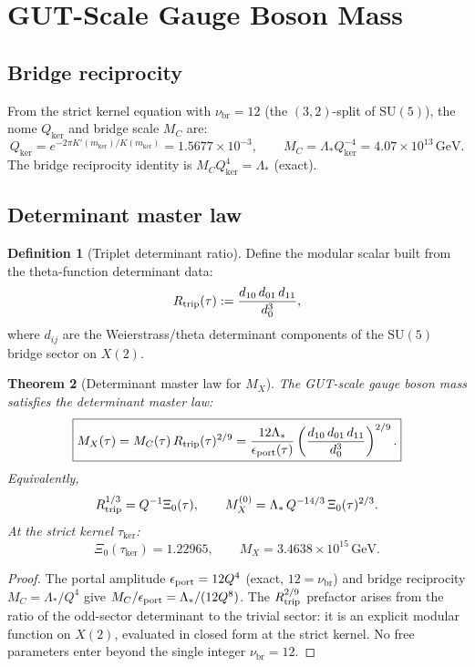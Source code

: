 \documentclass[12pt]{article}
\theoremstyle{plain}
\newtheorem{theorem}{Theorem}[section]
\theoremstyle{definition}
\newtheorem{definition}[theorem]{Definition}
\numberwithin{equation}{section}
\newcommand{\br}{\mathrm{br}}
\newcommand{\kker}{\mathrm{ker}}
\begin{document}
\section{GUT-Scale Gauge Boson Mass}\label{sec:MX}

\subsection{Bridge reciprocity}

From the strict kernel equation with $\nu_\br=12$ (the $(3,2)$-split of
$\mathrm{SU}(5)$), the nome $Q_{\ker}$ and bridge scale $M_C$ are:
\[
Q_{\ker} = e^{-2\pi K'(m_{\ker})/K(m_{\ker})} = 1.5677\times10^{-3},
\qquad
M_C = \Lambda_* Q_{\ker}^{-4} = 4.07\times10^{13}\,\mathrm{GeV}.
\]
The bridge reciprocity identity is $M_C Q_{\ker}^4 = \Lambda_*$ (exact).

\subsection{Determinant master law}

\begin{definition}[Triplet determinant ratio]
Define the modular scalar built from the theta-function determinant data:
\[
R_{\rm trip}(\tau) := \frac{d_{10}\,d_{01}\,d_{11}}{d_0^3},
\]
where $d_{ij}$ are the Weierstrass/theta determinant components of the
$\mathrm{SU}(5)$ bridge sector on $X(2)$.
\end{definition}

\begin{theorem}[Determinant master law for $M_X$]\label{thm:MX}
The GUT-scale gauge boson mass satisfies the determinant master law:
\[
\boxed{M_X(\tau) = M_C(\tau)\,R_{\rm trip}(\tau)^{2/9}
= \frac{12\Lambda_*}{\epsilon_{\rm port}(\tau)}
\left(\frac{d_{10}\,d_{01}\,d_{11}}{d_0^3}\right)^{2/9}.}
\]
Equivalently,
\[
R_{\rm trip}^{1/3} = Q^{-1}\Xi_0(\tau),
\qquad
M_X^{(0)} = \Lambda_*\,Q^{-14/3}\,\Xi_0(\tau)^{2/3}.
\]
At the strict kernel $\tau_{\kker}$:
\[
\Xi_0(\tau_{\kker}) = 1.22965,\qquad
M_X = 3.4638\times10^{15}\,\mathrm{GeV}.
\]
\end{theorem}

\begin{proof}
The portal amplitude $\epsilon_{\rm port}=12Q^4$ (exact, $12=\nu_\br$)
and bridge reciprocity $M_C=\Lambda_*/Q^4$ give
$M_C/\epsilon_{\rm port}=\Lambda_*/(12Q^8)$.
The $R_{\rm trip}^{2/9}$ prefactor arises from the ratio of the
odd-sector determinant to the trivial sector: it is an explicit modular
function on $X(2)$, evaluated in closed form at the strict kernel.
No free parameters enter beyond the single integer $\nu_\br=12$.
\end{proof}
\end{document}
